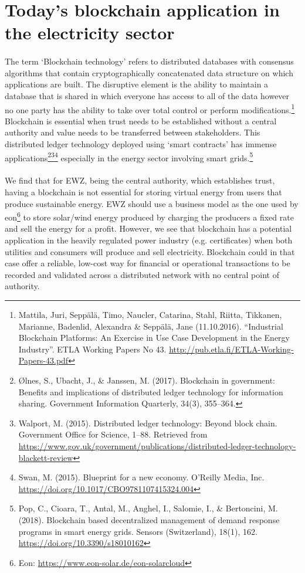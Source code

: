 \documentclass{scrartcl}
\begin{document}
	\section{Today’s blockchain application in the electricity sector}
    
    \paragraph{}
    The term ‘Blockchain technology’ refers to distributed databases with consensus algorithms that contain cryptographically concatenated data structure on which applications are built. The disruptive element is the ability to maintain a database that is shared in which everyone has access to all of the data however no one party has the ability to take over total control or perform modifications.\footnote{Mattila, Juri, Seppälä, Timo, Naucler, Catarina, Stahl, Riitta, Tikkanen, Marianne, Badenlid, Alexandra \& Seppälä, Jane (11.10.2016). “Industrial Blockchain Platforms: An Exercise in Use Case Development in the Energy Industry”. ETLA Working Papers No 43. \url{http://pub.etla.fi/ETLA-Working-Papers-43.pdf}} Blockchain is essential when trust needs to be established without a central authority and value needs to be transferred between stakeholders. This distributed ledger technology deployed using ‘smart contracts’ has immense applications\footnote{Ølnes, S., Ubacht, J., \& Janssen, M. (2017). Blockchain in government: Benefits and implications of distributed ledger technology for information sharing. Government Information Quarterly, 34(3), 355–364.}\footnote{Walport, M. (2015). Distributed ledger technology: Beyond block chain. Government Office for Science, 1–88. Retrieved from \url{https://www.gov.uk/government/publications/distributed-ledger-technology-blackett-review}}\footnote{Swan, M. (2015). Blueprint for a new economy. O’Reilly Media, Inc. \url{https://doi.org/10.1017/CBO9781107415324.004}} especially in the energy sector involving smart grids.\footnote{Pop, C., Cioara, T., Antal, M., Anghel, I., Salomie, I., \& Bertoncini, M. (2018). Blockchain based decentralized management of demand response programs in smart energy grids. Sensors (Switzerland), 18(1), 162. \url{https://doi.org/10.3390/s18010162}}
    
    \paragraph{}
    We find that for EWZ, being the central authority, which establishes trust, having a blockchain is not essential for storing virtual energy from users that produce sustainable energy. EWZ should use a business model as the one used by eon\footnote{Eon: \url{https://www.eon-solar.de/eon-solarcloud}} to store solar/wind energy produced by charging the producers a fixed rate and sell the energy for a profit. However, we see that blockchain has a potential application in the heavily regulated power industry (e.g. certificates) when both utilities and consumers will produce and sell electricity. Blockchain could in that case offer a reliable, low-cost way for financial or operational transactions to be recorded and validated across a distributed network with no central point of authority.
    
\end{document}
